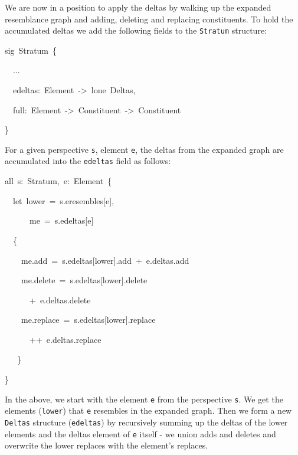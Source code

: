 We are now in a position to apply the deltas by walking up the expanded
resemblance graph and adding, deleting and replacing constituents.
To hold the accumulated deltas we add the following fields to the
\texttt{Stratum} structure:
\begin{lyxcode}
{\footnotesize{}sig~Stratum~\{}{\footnotesize \par}

{\footnotesize{}~~...}{\footnotesize \par}

{\footnotesize{}~~edeltas:~Element~->~lone~Deltas,}{\footnotesize \par}

{\footnotesize{}~~full:~Element~->~Constituent~->~Constituent}{\footnotesize \par}

{\footnotesize{}\}}{\footnotesize \par}
\end{lyxcode}
For a given perspective \texttt{s}, element \texttt{e}, the deltas
from the expanded graph are accumulated into the \texttt{edeltas}
field as follows:
\begin{lyxcode}
{\footnotesize{}all~s:~Stratum,~e:~Element~\{}{\footnotesize \par}

{\footnotesize{}~~let~lower~=~s.eresembles{[}e{]},}{\footnotesize \par}

{\footnotesize{}~~~~~~me~=~s.edeltas{[}e{]}}{\footnotesize \par}

{\footnotesize{}~~\{}{\footnotesize \par}

{\footnotesize{}~~~~me.add~=~s.edeltas{[}lower{]}.add~+~e.deltas.add}{\footnotesize \par}

{\footnotesize{}~~~~me.delete~=~s.edeltas{[}lower{]}.delete}{\footnotesize \par}

{\footnotesize{}~~~~~~+~e.deltas.delete}{\footnotesize \par}

{\footnotesize{}~~~~me.replace~=~s.edeltas{[}lower{]}.replace}{\footnotesize \par}

{\footnotesize{}~~~~~~++~e.deltas.replace}{\footnotesize \par}

{\footnotesize{}~~~\}}{\footnotesize \par}

{\footnotesize{}\}}{\footnotesize \par}
\end{lyxcode}
In the above, we start with the element \texttt{e} from the perspective
\texttt{s}. We get the elements (\texttt{lower}) that \texttt{e} resembles
in the expanded graph. Then we form a new \texttt{Deltas} structure
(\texttt{edeltas}) by recursively summing up the deltas of the lower
elements and the deltas element of \texttt{e} itself - we union adds
and deletes and overwrite the lower replaces with the element\textquoteright s
replaces.

